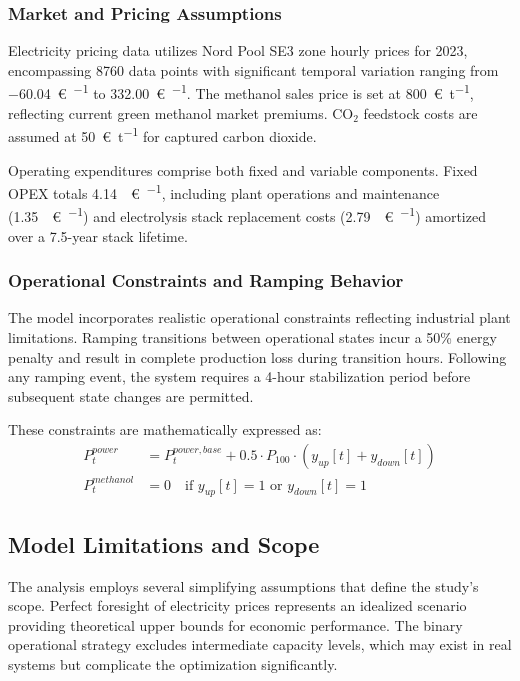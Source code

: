 \documentclass[12pt,a4paper]{article}
\begin{document}
\subsubsection{Market and Pricing Assumptions}

Electricity pricing data utilizes Nord Pool SE3 zone hourly prices for 2023, encompassing 8760 data points with significant temporal variation ranging from \SI{-60.04}{\euro\per\MWh} to \SI{332.00}{\euro\per\MWh}. The methanol sales price is set at \SI{800}{\euro\per\tonne}, reflecting current green methanol market premiums. CO$_2$ feedstock costs are assumed at \SI{50}{\euro\per\tonne} for captured carbon dioxide.

Operating expenditures comprise both fixed and variable components. Fixed OPEX totals \SI{4.14}{\mega\euro\per\year}, including plant operations and maintenance (\SI{1.35}{\mega\euro\per\year}) and electrolysis stack replacement costs (\SI{2.79}{\mega\euro\per\year}) amortized over a 7.5-year stack lifetime.

\subsubsection{Operational Constraints and Ramping Behavior}

The model incorporates realistic operational constraints reflecting industrial plant limitations. Ramping transitions between operational states incur a 50\% energy penalty and result in complete production loss during transition hours. Following any ramping event, the system requires a 4-hour stabilization period before subsequent state changes are permitted.

These constraints are mathematically expressed as:
\begin{align}
P_t^{power} &= P_t^{power,base} + 0.5 \cdot P_{100} \cdot (y_{up}[t] + y_{down}[t]) \\
P_t^{methanol} &= 0 \quad \text{if } y_{up}[t] = 1 \text{ or } y_{down}[t] = 1
\end{align}

\subsection{Model Limitations and Scope}

The analysis employs several simplifying assumptions that define the study's scope. Perfect foresight of electricity prices represents an idealized scenario providing theoretical upper bounds for economic performance. The binary operational strategy excludes intermediate capacity levels, which may exist in real systems but complicate the optimization significantly.
\end{document}
